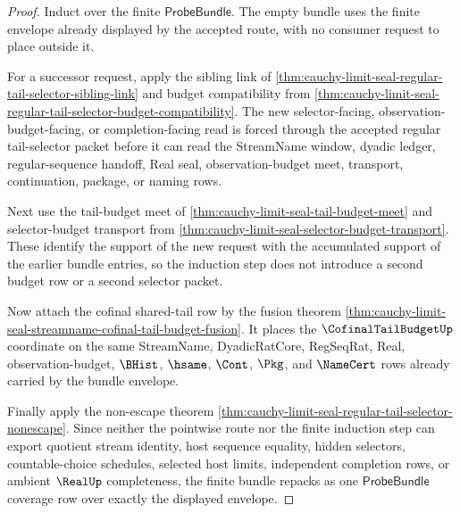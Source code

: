 \begin{proof}
Induct over the finite $\mathsf{ProbeBundle}$. The empty bundle uses the finite envelope already displayed by the accepted route, with no consumer request to place outside it.

For a successor request, apply the sibling link of \autoref{thm:cauchy-limit-seal-regular-tail-selector-sibling-link} and budget compatibility from \autoref{thm:cauchy-limit-seal-regular-tail-selector-budget-compatibility}. The new selector-facing, observation-budget-facing, or completion-facing read is forced through the accepted regular tail-selector packet before it can read the StreamName window, dyadic ledger, regular-sequence handoff, Real seal, observation-budget meet, transport, continuation, package, or naming rows.

Next use the tail-budget meet of \autoref{thm:cauchy-limit-seal-tail-budget-meet} and selector-budget transport from \autoref{thm:cauchy-limit-seal-selector-budget-transport}. These identify the support of the new request with the accumulated support of the earlier bundle entries, so the induction step does not introduce a second budget row or a second selector packet.

Now attach the cofinal shared-tail row by the fusion theorem \autoref{thm:cauchy-limit-seal-streamname-cofinal-tail-budget-fusion}. It places the $\CofinalTailBudgetUp$ coordinate on the same StreamName, DyadicRatCore, RegSeqRat, Real, observation-budget, $\BHist$, $\hsame$, $\Cont$, $\Pkg$, and $\NameCert$ rows already carried by the bundle envelope.

Finally apply the non-escape theorem \autoref{thm:cauchy-limit-seal-regular-tail-selector-nonescape}. Since neither the pointwise route nor the finite induction step can export quotient stream identity, host sequence equality, hidden selectors, countable-choice schedules, selected host limits, independent completion rows, or ambient $\RealUp$ completeness, the finite bundle repacks as one $\mathsf{ProbeBundle}$ coverage row over exactly the displayed envelope.
\end{proof}

